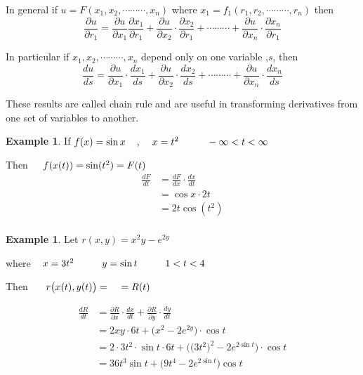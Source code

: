 \documentclass[11pt,a4paper]{article}
\theoremstyle{definition}
\newtheorem{exa}[thm]{Example}
\begin{document}
In general if $u  = F(x_1,x_2,\cdots\cdots\cdots, x_n)$ where $x_1 = f_1 (r_1,r_2,\cdots\cdots\cdots, r_n)$ then $$\frac{\partial u}{\partial r_1}=\frac{\partial u}{\partial x_1}\frac{\partial x_1}{\partial r_1}+ \frac{\partial u}{\partial x_2} \cdot \frac{\partial x_2}{\partial r_1}+\cdots\cdots\cdots + \frac{\partial u}{\partial x_n}\cdot \frac{\partial x_n}{\partial r_1}$$

In particular if $x_1,x_2,\cdots\cdots\cdots, x_n$ depend only on one variable ,$s$, then 
 $$\frac{du}{ds} = \frac{\partial u}{\partial x_1}\cdot \frac{dx_1}{ds}+ \frac{\partial u}{\partial x_2}\cdot \frac{dx_2}{ds} +\cdots\cdots\cdots +\frac{\partial u}{\partial x_n}\cdot \frac{dx_n}{ds}$$

These results are called chain rule and are useful in transforming derivatives from one set of variables to another.


\begin{exa}


If $f(x) = \sin x\hspace{0.4cm}, \hspace{0.4cm} x = t^2\hspace{1cm} -\infty < t < \infty$


Then $\hspace{0.4cm} f(x(t)) = \sin (t^2) = F(t)$
\begin{align*}
\frac{dF}{d t} &  = \frac{d F}{dx}\cdot \frac{d x}{dt}\\
& = \cos x \cdot 2t\\
& = 2t\cos(t^2)\\
\end{align*}
\end{exa}

\begin{exa}


Let $r(x,y) =x^2y - e^{2y}$


where$\hspace{0.4cm} x = 3t^2\hspace{1cm} y = \sin t \hspace{1cm}  1< t <4$


Then $\hspace{0.5cm} r\big(x(t),y(t)\big) =  \hspace{0.5cm} = R(t)$

\begin{align*}
\frac{dR}{dt} & = \frac{\partial R}{\partial x}\cdot \frac{dx}{dt} + \frac{\partial R}{\partial y}\cdot \frac{dy}{dt}\\
&  = 2xy\cdot 6t + \big(x^2 - 2e^{2y}\big)\cdot \cos t\\
& = 2\cdot 3t^2\cdot \sin t \cdot 6t + \big(\big(3t^2\big)^2 - 2e^{2\sin t}\big) \cdot \cos t\\
& = 36t^3\sin t + \big( 9t^4 - 2e^{2\sin t}\big)\cos t\\ 
\end{align*}
\end{exa}
\end{document}
